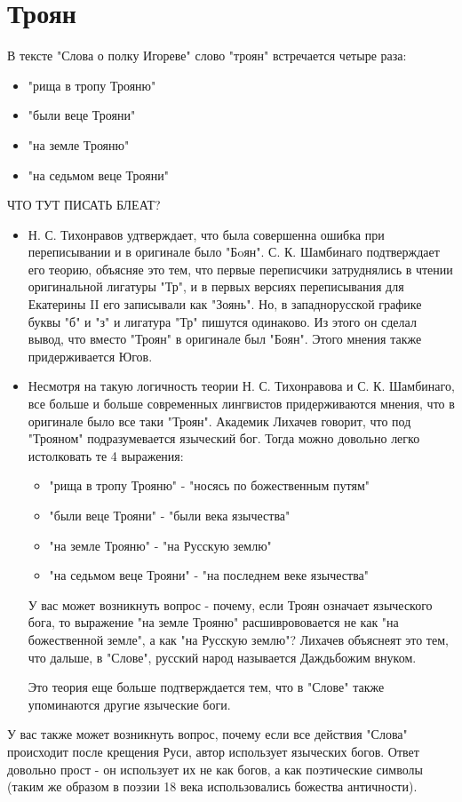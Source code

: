 \documentclass[14pt, a4paper]{article}
\begin{document}
{\section{Троян}
В тексте "Слова о полку Игореве" слово "троян" встречается четыре раза:
\begin{itemize}
  \item "рища в тропу Трояню"
  \item "были веце Трояни"
  \item "на земле Трояню"
  \item "на седьмом веце Трояни"
\end{itemize}
\par ЧТО ТУТ ПИСАТЬ БЛЕАТ?
\begin{itemize}
    \item Н. С. Тихонравов удтверждает, что была совершенна ошибка при переписывании и в оригинале было "Бoян". С. К. Шамбинаго подтверждает его теорию, объясняе это тем, что первые переписчики затруднялись в чтении оригинальной лигатуры "Тр", и в первых версиях переписывания для Екатерины II его записывали как "Зоянь". Но, в западнорусской графике буквы "б" и "з" и лигатура "Тр" пишутся одинаково. Из этого он сделал вывод, что вместо "Троян" в оригинале был "Боян". Этого мнения также придерживается Югов.
    \item Несмотря на такую логичность теории Н. С. Тихонравова и С. К. Шамбинаго, все больше и больше современных лингвистов придерживаются мнения, что в оригинале было все таки "Троян". Академик Лихачев говорит, что под "Трояном" подразумевается языческий бог. Тогда можно довольно легко истолковать те 4 выражения:
    \begin{itemize}
      \item "рища в тропу Трояню" - "носясь по божественным путям"
      \item "были веце Трояни" - "были века язычества"
      \item "на земле Трояню" - "на Русскую землю"
      \item "на седьмом веце Трояни" - "на последнем веке язычества"
    \end{itemize}
    У вас может возникнуть вопрос - почему, если Троян означает языческого бога, то выражение "на земле Трояню" расшиврововается не как "на божественной земле", а как "на Русскую землю"? Лихачев объяснеят это тем, что дальше, в "Слове", русский народ называется Даждьбожим внуком.
    \par Это теория еще больше подтверждается тем, что в "Слове" также упоминаются другие языческие боги.
\end{itemize}
У вас также может возникнуть вопрос, почему если все действия "Слова" происходит после крещения Руси, автор использует языческих богов. Ответ довольно прост - он использует их не как богов, а как поэтические символы (таким же образом в поэзии 18 века использовались божества античности).

}
\end{document}
